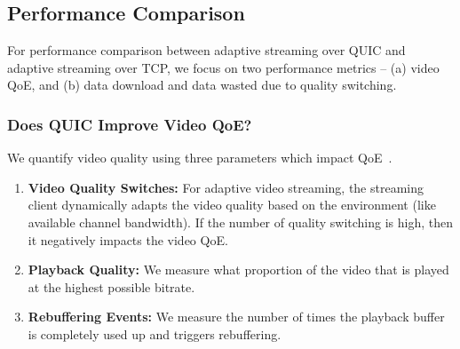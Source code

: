 \subsection{Performance Comparison}
For performance comparison between adaptive streaming over \ac{QUIC} and adaptive streaming over \ac{TCP}, we focus on two performance metrics -- (a) video \ac{QoE}, and (b) data download and data wasted due to quality switching. 

\subsubsection{Does QUIC Improve Video QoE?}
We quantify video quality using three parameters which impact \ac{QoE}~\cite{balachandran2012quest}.
\begin{enumerate}[leftmargin=*]
	\item\textbf{Video Quality Switches:} For adaptive video streaming, the streaming client dynamically adapts the video quality based on the environment (like available channel bandwidth). If the number of quality switching is high, then it negatively impacts the video QoE. 
	\item\textbf{Playback Quality:} We measure what proportion of the video that is played at the highest possible bitrate. 
	\item\textbf{Rebuffering Events:} We measure the number of times the playback buffer is completely used up and triggers rebuffering.
\end{enumerate}

